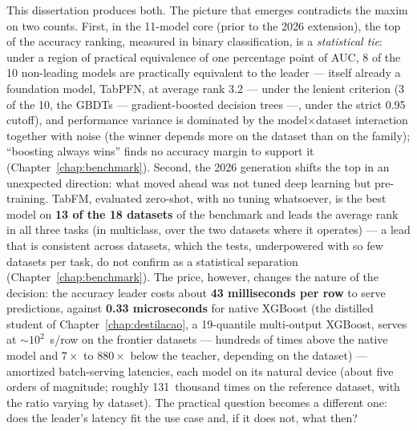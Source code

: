 This dissertation produces both. The picture that emerges contradicts
the maxim on two counts. First, in the 11-model core (prior to the
2026 extension), the top of the accuracy ranking, measured in binary
classification, is a \emph{statistical tie}:
under a region of practical equivalence of one percentage point of
AUC, 8 of the 10 non-leading models are practically equivalent to the
leader --- itself already a foundation model, TabPFN, at average rank
3.2 --- under the lenient criterion (3 of the 10, the GBDTs ---
gradient-boosted decision trees ---, under the
strict 0.95 cutoff), and performance variance is dominated by the
model$\times$dataset interaction together with noise (the winner
depends more on the dataset
than on the family); ``boosting always wins'' finds no accuracy margin
to support it (Chapter~\ref{chap:benchmark}). Second, the 2026
generation shifts the top in an unexpected direction: what moved ahead
was not tuned deep learning but pre-training. TabFM, evaluated
zero-shot, with no tuning whatsoever, is the best model on \textbf{13
of the 18 datasets} of the benchmark and leads the average rank in all
three tasks (in multiclass, over the two datasets where it operates)
--- a lead that is consistent across datasets, which the tests,
underpowered with so few datasets per task, do not confirm as a
statistical separation (Chapter~\ref{chap:benchmark}). The price,
however, changes the nature of the decision: the accuracy leader costs
about \textbf{43 milliseconds per row} to serve predictions, against
\textbf{0.33 microseconds} for native XGBoost (the distilled student
of Chapter~\ref{chap:destilacao}, a 19-quantile multi-output
XGBoost, serves at
${\sim}10^2$~\textmu s/row on the frontier datasets --- hundreds of
times above the native model and $7\times$ to $880\times$ below the
teacher, depending on the dataset) --- amortized batch-serving
latencies, each model on its natural device (about five orders of
magnitude; roughly 131~thousand times on the reference dataset, with
the ratio varying by dataset). The practical question becomes a
different one: does the leader's latency fit the use case and, if it
does not, what then?


